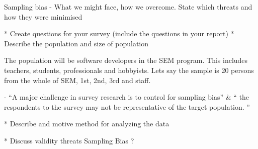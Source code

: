 \documentclass[times, 10pt,twocolumn]{IEEEtran}
\begin{document}
Sampling bias - What we might face, how we overcome. State which threats and how they were minimised

* Create  questions for your  survey  (include  the questions in  your  report)
* Describe  the population  and size  of  population

The population will be software developers in the SEM program. This includes teachers, students, professionals and hobbyists. Lets say the sample is 20 persons from the whole of SEM, 1st, 2nd, 3rd and staff.

\cite{easterbrook2008selecting} - ``A major challenge in survey research is to control for sampling bias'' \& `` the respondents to 
the survey may not be representative of the target population. ''

* Describe  and motive  method  for analyzing the data

* Discuss validity  threats
  Sampling Bias ?







\end{document}
